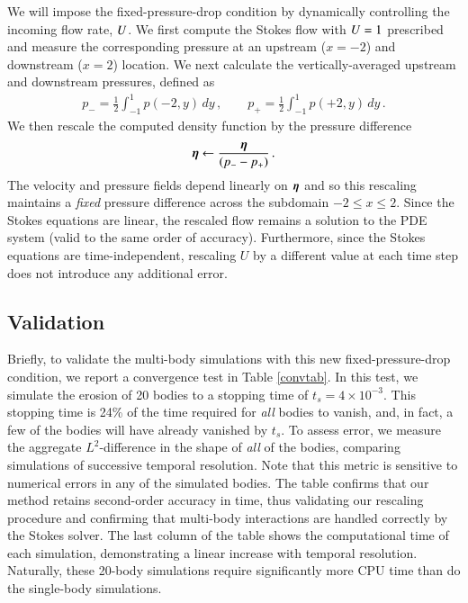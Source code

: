 \documentclass[preprint, 10pt]{elsarticle}
\begin{document}
We will impose the fixed-pressure-drop condition by dynamically controlling the incoming flow rate, $U$. We first compute the Stokes flow with $U = 1$ prescribed and measure the corresponding pressure at an upstream ($x = -2$) and downstream ($x=2$) location. We next calculate the vertically-averaged upstream and downstream pressures, defined as
\begin{align}
p_{-} = \frac{1}{2} \int_{-1}^{1} p(-2,y) \, dy \, , \qquad
p_{+} = \frac{1}{2} \int_{-1}^{1} p(+2,y) \, dy \, .
\end{align}
We then rescale the computed density function by the pressure difference
\begin{align}
{\boldsymbol\eta} \leftarrow \frac{{\boldsymbol\eta}}{(p_{-} - p_{+})} \, .
\end{align}
The velocity and pressure fields depend linearly on ${\boldsymbol\eta}$ and so this rescaling maintains a {\em fixed} pressure difference across the subdomain $-2 \le x \le 2$. Since the Stokes equations are linear, the rescaled flow remains a solution to the PDE system (valid to the same order of accuracy). Furthermore, since the Stokes equations are time-independent, rescaling $U$ by a different value at each time step does not introduce any additional error.

\subsection{Validation}

Briefly, to validate the multi-body simulations with this new
fixed-pressure-drop condition, we report a convergence test in Table
\ref{convtab}. In this test, we simulate the erosion of 20 bodies to a
stopping time of $t_s = 4 \times 10^{-3}$. This stopping time is 24\% of
the time required for {\em all} bodies to vanish, and, in fact, a few of
the bodies will have already vanished by $t_s$. To assess error, we
measure the aggregate $L^2$-difference in the shape of {\em all} of the
bodies, comparing simulations of successive temporal resolution. Note
that this metric is sensitive to numerical errors in any of the
simulated bodies. The table confirms that our method retains
second-order accuracy in time, thus validating our rescaling procedure
and confirming that multi-body interactions are handled correctly by the Stokes solver. The last column of the table shows the computational time of each simulation, demonstrating a linear increase with temporal resolution. Naturally, these 20-body simulations require significantly more CPU time than do the single-body simulations.
\end{document}
